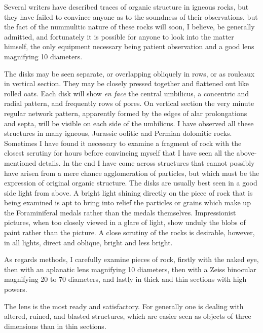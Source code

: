 \documentclass[a4paper, 12pt, oneside]{article}
\begin{document}
Several writers have described traces of organic structure in igneous rocks, but they have failed to convince anyone as to the soundness of their observations, but the fact of the nummulitic nature of these rocks will soon, I believe, be generally admitted, and fortunately it is possible for anyone to look into the matter himself, the only equipment necessary being patient observation and a good lens magnifying 10 diameters.

The disks may be seen separate, or overlapping obliquely in rows, or as rouleaux in vertical section. They may be closely pressed together and flattened out like rolled oats. Each disk will show \emph{en face} the central umbilicus, a concentric and radial pattern, and frequently rows of pores. On vertical section the very minute regular network pattern, apparently formed by the edges of alar prolongations and septa, will be visible on each side of the umbilicus. I have observed all these structures in many igneous, Jurassic oolitic and Permian dolomitic rocks. Sometimes I have found it necessary to examine a fragment of rock with the closest scrutiny for hours before convincing myself that I have seen all the above-mentioned details. In the end I have come across structures that cannot possibly have arisen from a mere chance agglomeration of particles, but which must be the expression of original organic structure. The disks are usually best seen in a good side light from above. A bright light shining directly on the piece of rock that is being examined is apt to bring into relief the particles or grains which make up the Foraminiferal medals rather than the medals themselves. Impressionist pictures, when too closely viewed in a glare of light, show unduly the blobs of paint rather than the picture. A close scrutiny of the rocks is desirable, however, in all lights, direct and oblique, bright and less bright.

As regards methods, I carefully examine pieces of rock, firstly with the naked eye, then with an aplanatic lens magnifying 10 diameters, then with a Zeiss binocular magnifying 20 to 70 diameters, and lastly in thick and thin sections with high powers.

The lens is the most ready and satisfactory. For generally one is dealing with altered, ruined, and blasted structures, which are easier seen as objects of three dimensions than in thin sections.
\end{document}
